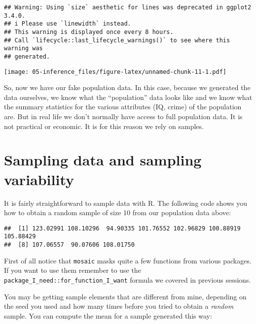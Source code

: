 \documentclass[
]{book}
\newenvironment{Shaded}{\begin{snugshade}}{\end{snugshade}}
\newcommand{\CommentTok}[1]{\textcolor[rgb]{0.56,0.35,0.01}{\textit{#1}}}
\newcommand{\DecValTok}[1]{\textcolor[rgb]{0.00,0.00,0.81}{#1}}
\newcommand{\FunctionTok}[1]{\textcolor[rgb]{0.13,0.29,0.53}{\textbf{#1}}}
\newcommand{\NormalTok}[1]{#1}
\newcommand{\SpecialCharTok}[1]{\textcolor[rgb]{0.81,0.36,0.00}{\textbf{#1}}}
\begin{document}
\begin{verbatim}
## Warning: Using `size` aesthetic for lines was deprecated in ggplot2 3.4.0.
## i Please use `linewidth` instead.
## This warning is displayed once every 8 hours.
## Call `lifecycle::last_lifecycle_warnings()` to see where this warning was
## generated.
\end{verbatim}

\texttt{[image: 05-inference\_files/figure-latex/unnamed-chunk-11-1.pdf]}

So, now we have our fake population data. In this case, because we generated the data ourselves, we know what the ``population'' data looks like and we know what the summary statistics for the various attributes (IQ, crime) of the population are. But in real life we don't normally have access to full population data. It is not practical or economic. It is for this reason we rely on samples.

\section{Sampling data and sampling variability}\label{sampling-data-and-sampling-variability}

It is fairly straightforward to sample data with R. The following code shows you how to obtain a random sample of size 10 from our population data above:

\begin{Shaded}
\end{Shaded}

\begin{verbatim}
##  [1] 123.02991 108.10296  94.90335 101.76552 102.96829 100.88919 105.88429
##  [8] 107.06557  90.07606 108.01750
\end{verbatim}

First of all notice that \texttt{mosaic} masks quite a few functions from various packages. If you want to use them remember to use the \texttt{\textquotesingle{}package\_I\_need\textquotesingle{}::\textquotesingle{}for\_function\_I\_want\textquotesingle{}} formula we covered in previous sessions.

You may be getting sample elements that are different from mine, depending on the seed you used and how many times before you tried to obtain a \emph{random} sample. You can compute the mean for a sample generated this way:
\end{document}
